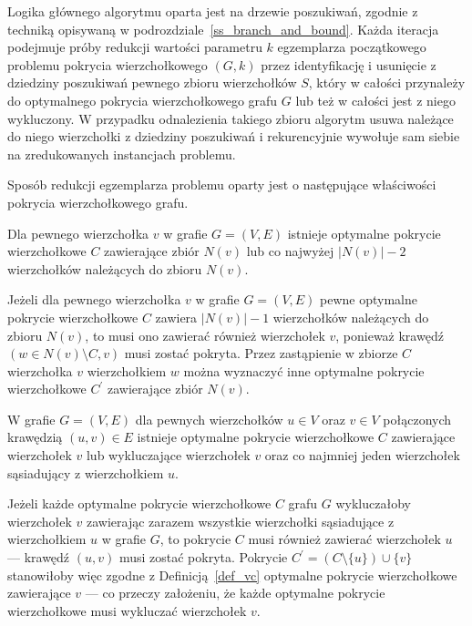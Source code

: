\par{
  Logika głównego algorytmu oparta jest na drzewie poszukiwań, zgodnie z techniką opisywaną w podrozdziale~\ref{ss_branch_and_bound}.
  Każda iteracja podejmuje próby redukcji wartości parametru $k$ egzemplarza początkowego problemu pokrycia wierzchołkowego $(G, k)$ przez identyfikację i usunięcie z dziedziny poszukiwań pewnego zbioru wierzchołków $S$, który w całości przynależy do optymalnego pokrycia wierzchołkowego grafu $G$ lub też w całości jest z niego wykluczony.
  W przypadku odnalezienia takiego zbioru algorytm usuwa należące do niego wierzchołki z dziedziny poszukiwań i rekurencyjnie wywołuje sam siebie na zredukowanych instancjach problemu.

  Sposób redukcji egzemplarza problemu oparty jest o następujące właściwości pokrycia wierzchołkowego grafu.
  \begin{theorem}
    Dla pewnego wierzchołka $v$ w grafie $G=(V, E)$ istnieje optymalne pokrycie wierzchołkowe $C$ zawierające zbiór $N(v)$ lub co najwyżej $|N(v)| - 2$ wierzchołków należących do zbioru $N(v)$.
  \end{theorem}
  \begin{bproof}
    Jeżeli dla pewnego wierzchołka $v$ w grafie $G=(V, E)$ pewne optymalne pokrycie wierzchołkowe $C$ zawiera $|N(v)|-1$ wierzchołków należących do zbioru $N(v)$, to musi ono zawierać również wierzchołek $v$, ponieważ krawędź $(w \in N(v) \setminus C, v)$ musi zostać pokryta.
    Przez zastąpienie w zbiorze $C$ wierzchołka $v$ wierzchołkiem $w$ można wyznaczyć inne optymalne pokrycie wierzchołkowe $C^\prime$ zawierające zbiór $N(v)$.
  \end{bproof}
  \begin{theorem}
     W grafie $G=(V, E)$ dla pewnych wierzchołków $u \in V$ oraz $v \in V$ połączonych krawędzią $(u, v) \in E$ istnieje optymalne pokrycie wierzchołkowe $C$ zawierające wierzchołek $v$ lub wykluczające wierzchołek $v$ oraz co najmniej jeden wierzchołek sąsiadujący z wierzchołkiem $u$.
  \end{theorem}
  \begin{bproof}
    Jeżeli każde optymalne pokrycie wierzchołkowe $C$ grafu $G$ wykluczałoby wierzchołek $v$ zawierając zarazem wszystkie wierzchołki sąsiadujące z wierzchołkiem $u$ w grafie $G$, to pokrycie $C$ musi również zawierać wierzchołek $u$ --- krawędź $(u, v)$ musi zostać pokryta.
    Pokrycie $C^\prime=(C \setminus \{u\}) \cup \{v\}$ stanowiłoby więc zgodne z Definicją~\ref{def_vc} optymalne pokrycie wierzchołkowe zawierające $v$ --- co przeczy założeniu, że każde optymalne pokrycie wierzchołkowe musi wykluczać wierzchołek $v$.

\end{bproof}}
